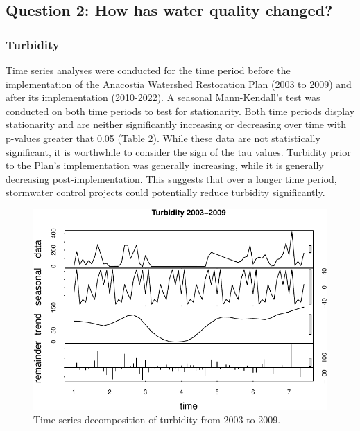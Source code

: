 \documentclass[
  12pt,
]{article}
\begin{document}
\hypertarget{question-2-how-has-water-quality-changed}{%
\subsection{Question 2: How has water quality
changed?}\label{question-2-how-has-water-quality-changed}}

\hypertarget{turbidity}{%
\subsubsection{Turbidity}\label{turbidity}}

Time series analyses were conducted for the time period before the
implementation of the Anacostia Watershed Restoration Plan (2003 to
2009) and after its implementation (2010-2022). A seasonal
Mann-Kendall's test was conducted on both time periods to test for
stationarity. Both time periods display stationarity and are neither
significantly increasing or decreasing over time with p-values greater
that 0.05 (Table 2). While these data are not statistically significant,
it is worthwhile to consider the sign of the tau values. Turbidity prior
to the Plan's implementation was generally increasing, while it is
generally decreasing post-implementation. This suggests that over a
longer time period, stormwater control projects could potentially reduce
turbidity significantly.

\begin{figure}

{\centering \includegraphics{Project_Template_files/figure-latex/Plot of Early Turbidity Time Series Decomposition-1} 

}

\caption{Time series decomposition of turbidity from 2003 to 2009.}\label{fig:Plot of Early Turbidity Time Series Decomposition}
\end{figure}
\end{document}
